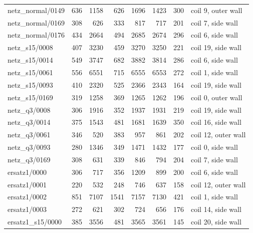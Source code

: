 \begin{tabular}{@{}lrrrrrrl@{}}
netz\_normal/0149 & \num{636} & \num{1158} & \num{626} & \num{1696} & \num{1423} & \num{300} & coil 9, outer wall \\
netz\_normal/0169 & \num{308} & \num{626} & \num{333} & \num{817} & \num{717} & \num{201} & coil 7, side wall \\
netz\_normal/0176 & \num{434} & \num{2664} & \num{494} & \num{2685} & \num{2674} & \num{296} & coil 6, side wall \\
netz\_s15/0008 & \num{407} & \num{3230} & \num{459} & \num{3270} & \num{3250} & \num{221} & coil 19, side wall \\
netz\_s15/0014 & \num{549} & \num{3747} & \num{682} & \num{3882} & \num{3814} & \num{286} & coil 6, side wall \\
netz\_s15/0061 & \num{556} & \num{6551} & \num{715} & \num{6555} & \num{6553} & \num{272} & coil 1, side wall \\
netz\_s15/0093 & \num{410} & \num{2320} & \num{525} & \num{2366} & \num{2343} & \num{164} & coil 19, side wall \\
netz\_s15/0169 & \num{319} & \num{1258} & \num{369} & \num{1265} & \num{1262} & \num{196} & coil 0, outer wall \\
netz\_q3/0008 & \num{306} & \num{1916} & \num{352} & \num{1937} & \num{1931} & \num{219} & coil 19, side wall \\
netz\_q3/0014 & \num{375} & \num{1543} & \num{481} & \num{1681} & \num{1639} & \num{350} & coil 16, side wall \\
netz\_q3/0061 & \num{346} & \num{520} & \num{383} & \num{957} & \num{861} & \num{202} & coil 12, outer wall \\
netz\_q3/0093 & \num{280} & \num{1346} & \num{349} & \num{1471} & \num{1432} & \num{177} & coil 0, side wall \\
netz\_q3/0169 & \num{308} & \num{631} & \num{339} & \num{846} & \num{794} & \num{204} & coil 7, side wall \\
ersatz1/0000 & \num{306} & \num{717} & \num{356} & \num{1209} & \num{899} & \num{200} & coil 6, side wall \\
ersatz1/0001 & \num{220} & \num{532} & \num{248} & \num{746} & \num{637} & \num{158} & coil 12, outer wall \\
ersatz1/0002 & \num{851} & \num{7107} & \num{1541} & \num{7157} & \num{7130} & \num{421} & coil 1, side wall \\
ersatz1/0003 & \num{272} & \num{621} & \num{302} & \num{724} & \num{656} & \num{176} & coil 14, side wall \\
ersatz1\_s15/0000 & \num{385} & \num{3556} & \num{481} & \num{3565} & \num{3561} & \num{145} & coil 20, side wall \\

\end{tabular}
